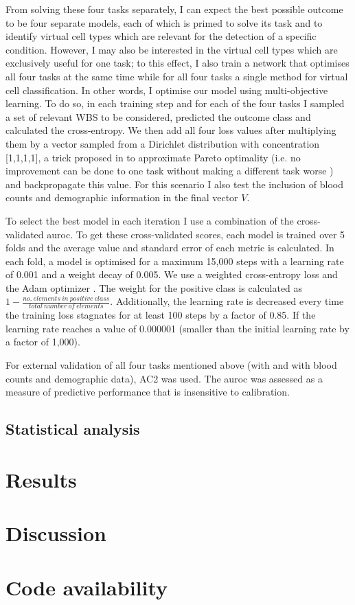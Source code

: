 From solving these four tasks separately, I can expect the best possible outcome to be four separate models, each of which is primed to solve its task and to identify virtual cell types which are relevant for the detection of a specific condition. However, I may also be interested in the virtual cell types which are exclusively useful for one task; to this effect, I also train a network that optimises all four tasks at the same time while for all four tasks a single method for virtual cell classification. In other words, I optimise our model using multi-objective learning. To do so, in each training step and for each of the four tasks I sampled a set of relevant WBS to be considered, predicted the outcome class and calculated the cross-entropy. We then add all four loss values after multiplying them by a vector sampled from a Dirichlet distribution with concentration [1,1,1,1], a trick proposed in \cite{Ruchte2021-ch} to approximate Pareto optimality (i.e. no improvement can be done to one task without making a different task worse \cite{Censor1977-nd}) and backpropagate this value. For this scenario I also test the inclusion of blood counts and demographic information in the final vector $V$.

To select the best model in each iteration I use a combination of the cross-validated \ac{auroc}. To get these cross-validated scores, each model is trained over 5 folds and the average value and standard error of each metric is calculated. In each fold, a model is optimised for a maximum 15,000 steps with a learning rate of 0.001 and a weight decay of 0.005. We use a weighted cross-entropy loss and the Adam optimizer \cite{Kingma2014-zd}. The weight for the positive class is calculated as $1 - \frac{no.\ elements\ in\ positive\ class}{total\ number\ of\ elements}$. Additionally, the learning rate is decreased every time the training loss stagnates for at least 100 steps by a factor of 0.85. If the learning rate reaches a value of 0.000001 (smaller than the initial learning rate by a factor of 1,000).

For external validation of all four tasks mentioned above (with and with blood counts and demographic data), AC2 was used. The \ac{auroc} was assessed as a measure of predictive performance that is insensitive to calibration. 

\subsection{Statistical analysis}

\section{Results}

\section{Discussion}

\section{Code availability}